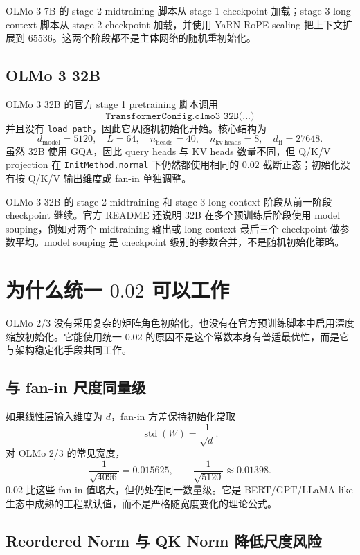 \documentclass[UTF8,a4paper,11pt]{ctexart}
\newcommand{\std}{\operatorname{std}}
\begin{document}
OLMo 3 7B 的 stage 2 midtraining 脚本从 stage 1 checkpoint 加载；stage 3 long-context 脚本从 stage 2 checkpoint 加载，并使用 YaRN RoPE scaling 把上下文扩展到 $65536$。这两个阶段都不是主体网络的随机重初始化。

\subsection{OLMo 3 32B}

OLMo 3 32B 的官方 stage 1 pretraining 脚本调用
\[
  \texttt{TransformerConfig.olmo3\_32B(...)}
\]
并且没有 \texttt{load\_path}，因此它从随机初始化开始。核心结构为
\[
  d_{\mathrm{model}}=5120,\quad L=64,\quad n_{\mathrm{heads}}=40,\quad n_{\mathrm{kv\ heads}}=8,\quad d_{\mathrm{ff}}=27648.
\]
虽然 32B 使用 GQA，因此 query heads 与 KV heads 数量不同，但 Q/K/V projection 在 \texttt{InitMethod.normal} 下仍然都使用相同的 $0.02$ 截断正态；初始化没有按 Q/K/V 输出维度或 fan-in 单独调整。

OLMo 3 32B 的 stage 2 midtraining 和 stage 3 long-context 阶段从前一阶段 checkpoint 继续。官方 README 还说明 32B 在多个预训练后阶段使用 model souping，例如对两个 midtraining 输出或 long-context 最后三个 checkpoint 做参数平均。model souping 是 checkpoint 级别的参数合并，不是随机初始化策略。

\section{为什么统一 $0.02$ 可以工作}

OLMo 2/3 没有采用复杂的矩阵角色初始化，也没有在官方预训练脚本中启用深度缩放初始化。它能使用统一 $0.02$ 的原因不是这个常数本身有普适最优性，而是它与架构稳定化手段共同工作。

\subsection{与 fan-in 尺度同量级}

如果线性层输入维度为 $d$，fan-in 方差保持初始化常取
\[
  \std(W)=\frac{1}{\sqrt d}.
\]
对 OLMo 2/3 的常见宽度，
\[
  \frac{1}{\sqrt{4096}}=0.015625,\qquad
  \frac{1}{\sqrt{5120}}\approx 0.01398.
\]
$0.02$ 比这些 fan-in 值略大，但仍处在同一数量级。它是 BERT/GPT/LLaMA-like 生态中成熟的工程默认值，而不是严格随宽度变化的理论公式。

\subsection{Reordered Norm 与 QK Norm 降低尺度风险}
\end{document}
